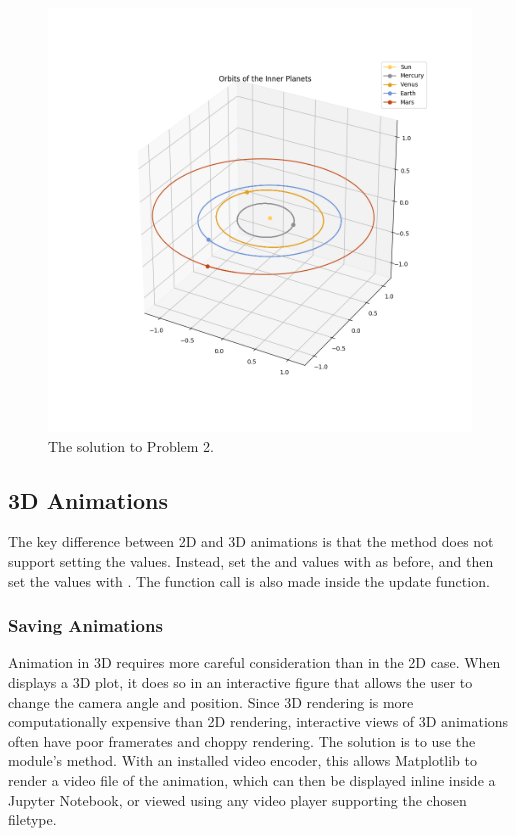 \begin{figure}[H]
\centering
\includegraphics[width=\textwidth]{figures/orbits.png}
\caption{The solution to Problem 2.}
\label{lab0:3dplot}
\end{figure}

\subsection*{3D Animations}
The key difference between 2D and 3D animations is that the  method does not support setting the  values.
Instead, set the  and  values with  as before, and then set the  values with .
The  function call is also made inside the update function. 

\subsubsection*{Saving Animations}
Animation in 3D requires more careful consideration than in the 2D case.
When  displays a 3D plot, it does so in an interactive figure that allows the user to change the camera angle and position.
Since 3D rendering is more computationally expensive than 2D rendering, interactive views of 3D animations often have poor framerates and choppy rendering.
The solution is to use the  module's  method.
With an installed video encoder, this allows Matplotlib to render a video file of the animation, which can then be displayed inline inside a Jupyter Notebook, or viewed using any video player supporting the chosen filetype. 

